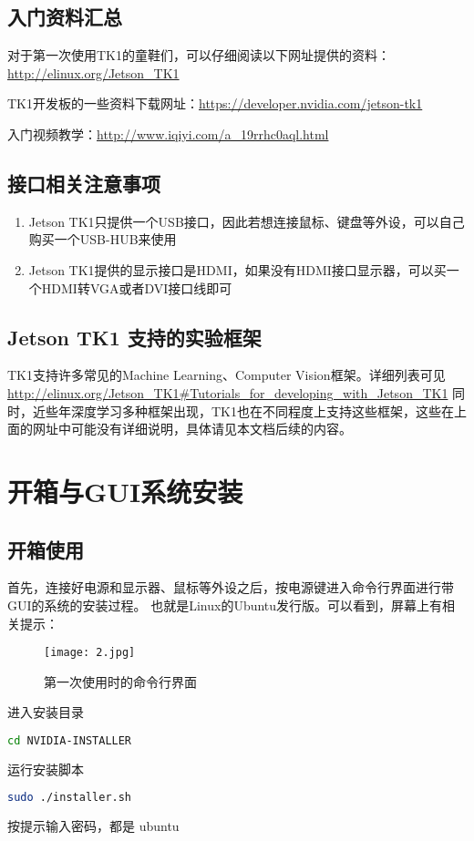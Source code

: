 \documentclass[openany]{ctexbook}
\newcommand{\warn}[1] {\fcolorbox{red!20}{red!20} {\color{red} #1}}
\begin{document}
\section{入门资料汇总}
对于第一次使用TK1的童鞋们，可以仔细阅读以下网址提供的资料：\url{http://elinux.org/Jetson_TK1}

TK1开发板的一些资料下载网址：\url{https://developer.nvidia.com/jetson-tk1}

入门视频教学：\url{http://www.iqiyi.com/a_19rrhc0aql.html}

\section{接口相关注意事项}
\begin{enumerate}
  \item Jetson TK1只提供一个USB接口，因此若想连接鼠标、键盘等外设，可以自己购买一个USB-HUB来使用
  \item Jetson TK1提供的显示接口是HDMI，如果没有HDMI接口显示器，可以买一个HDMI转VGA或者DVI接口线即可
\end{enumerate}

\section{Jetson TK1 支持的实验框架}
TK1支持许多常见的Machine Learning、Computer Vision框架。详细列表可见\url{http://elinux.org/Jetson_TK1#Tutorials_for_developing_with_Jetson_TK1}
同时，近些年深度学习多种框架出现，TK1也在不同程度上支持这些框架，这些在上面的网址中可能没有详细说明，具体请见本文档后续的内容。


\chapter{开箱与GUI系统安装}
\section{开箱使用}
首先，连接好电源和显示器、鼠标等外设之后，按电源键进入命令行界面进行带GUI的系统的安装过程。
也就是Linux的Ubuntu发行版。可以看到，屏幕上有相关提示：
\begin{figure}[h]
  \centering
  \texttt{[image: 2.jpg]}
  \caption{第一次使用时的命令行界面}
\end{figure}

进入安装目录
{\setmainfont{Courier New Bold}                          %
\begin{lstlisting}[language=bash]
cd NVIDIA-INSTALLER
\end{lstlisting}}
运行安装脚本
{\setmainfont{Courier New Bold}                          %
\begin{lstlisting}[language=bash]
sudo ./installer.sh
\end{lstlisting}}
按提示输入密码，都是\warn{ubuntu}
\end{document}
